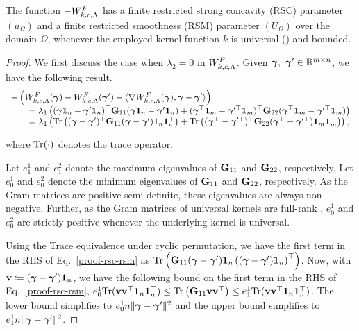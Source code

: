 \begin{lemma}\label{lemma:rsc-rsm}
The function $-W^F_{k, c, \Lambda}$ has a finite restricted strong concavity (RSC) parameter $(u_\Omega)$ and a finite restricted smoothness (RSM) parameter $(U_\Omega)$ over the domain $\Omega$, whenever the employed kernel function $k$ is universal (\citep{SriperumbudurFL11}) and bounded.
\end{lemma}
\begin{proof} We first discuss the case when $\lambda_2=0$ in $W^F_{k, c, \Lambda}$. Given $\bm{\gamma},\ \bm{\gamma}'\in \mathbb{R}^{m\times n}$, we have the following result.
\begin{equation}\label{proof-rsc-rsm}
\begin{array}{l}
-\left(\calWF(\bgamma)  - \calWF(\bgamma')-\langle\nabla \calWF(\bgamma), \bgamma-\bgamma'\rangle\right)\\
\qquad =\lambda_1\left( (\bgamma\bone_n-\bgamma'\bone_n)^\top\bG_{11}(\bgamma\bone_n-\bgamma'\bone_n)+(\bgamma^\top\bone_m-\bgamma'^\top\bone_m)^\top\bG_{22}(\bgamma^\top\bone_m-\bgamma'^\top\bone_m)\right)\\
\qquad =\lambda_1\left( \textup{Tr}\left((\bgamma-\bgamma')^\top \bG_{11} (\bgamma-\bgamma')\bone_n\bone_n^\top\right) + \textup{Tr}\left((\bgamma^\top-\bgamma'^\top)^\top \bG_{22}(\bgamma^\top-\bgamma'^\top)\bone_m\bone_m^\top\right) \right),\vspace{0.4em}
\end{array}
\end{equation}
where $\textup{Tr}(\cdot)$ denotes the trace operator. 

Let $e^1_1$ and $e^2_1$ denote the maximum eigenvalues of $\mathbf{G}_{11}$ and $\mathbf{G}_{22}$, respectively. Let $e^1_0$ and $e^2_0$ denote the minimum eigenvalues of $\mathbf{G}_{11}$ and $\mathbf{G}_{22}$, respectively. As the Gram matrices are positive semi-definite, these eigenvalues are always non-negative. Further, as the Gram matrices of universal kernels \citep{SriperumbudurFL11} are full-rank \citep[Corollary~32]{Song08}, $e^1_0$ and $e^2_0$ are strictly positive whenever the underlying kernel is universal.

Using the Trace equivalence under cyclic permutation, we have the first term in the RHS of Eq.~\ref{proof-rsc-rsm} as $\textup{Tr}\left(\mathbf{G}_{11}(\bm{\gamma}-\bm{\gamma}')\mathbf{1}_n \left( (\bm{\gamma}-\bm{\gamma}')\mathbf{1}_n\right)^\top\right)$. Now, with $\mathbf{v} \coloneqq (\bm{\gamma}-\bm{\gamma}')\mathbf{1}_n$, we have the following bound on the first term in the RHS of Eq.~\ref{proof-rsc-rsm}, $e^1_0\textup{Tr}(\mathbf{v}\mathbf{v}^\top \mathbf{1}_n\mathbf{1}_n^\top) \leq \textup{Tr}\left(\mathbf{G}_{11}\mathbf{v}\mathbf{v}^\top\right) \leq e_1^1\textup{Tr}(\mathbf{v}\mathbf{v}^\top \mathbf{1}_n\mathbf{1}_n^\top)$. The lower bound simplifies to $e^1_0n \|\bm{\gamma}-\bm{\gamma}'\|^2$ and the upper bound simplifies to $e_1^1n \|\bm{\gamma}-\bm{\gamma}'\|^2$.


\end{proof}
